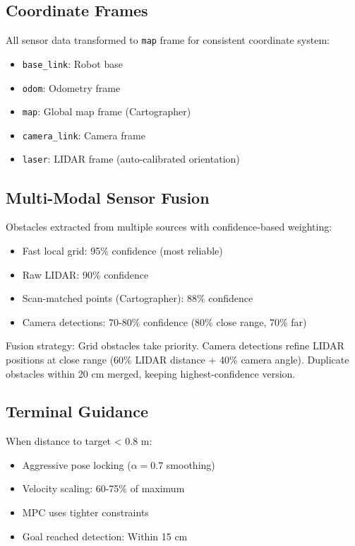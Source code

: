 \documentclass[11pt,a4paper]{article}
\begin{document}
\subsection{Coordinate Frames}

All sensor data transformed to \texttt{map} frame for consistent coordinate system:
\begin{itemize}
    \item \texttt{base\_link}: Robot base
    \item \texttt{odom}: Odometry frame
    \item \texttt{map}: Global map frame (Cartographer)
    \item \texttt{camera\_link}: Camera frame
    \item \texttt{laser}: LIDAR frame (auto-calibrated orientation)
\end{itemize}

\subsection{Multi-Modal Sensor Fusion}

Obstacles extracted from multiple sources with confidence-based weighting:
\begin{itemize}
    \item Fast local grid: 95\% confidence (most reliable)
    \item Raw LIDAR: 90\% confidence
    \item Scan-matched points (Cartographer): 88\% confidence
    \item Camera detections: 70-80\% confidence (80\% close range, 70\% far)
\end{itemize}

Fusion strategy: Grid obstacles take priority. Camera detections refine LIDAR positions at close range (60\% LIDAR distance + 40\% camera angle). Duplicate obstacles within 20 cm merged, keeping highest-confidence version.

\subsection{Terminal Guidance}

When distance to target < 0.8 m:
\begin{itemize}
    \item Aggressive pose locking ($\alpha = 0.7$ smoothing)
    \item Velocity scaling: 60-75\% of maximum
    \item MPC uses tighter constraints
    \item Goal reached detection: Within 15 cm
\end{itemize}
\end{document}
